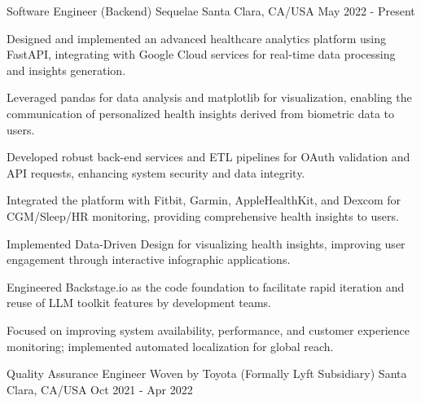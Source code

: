 

\begin{cventries}


  \cventry
    {Software Engineer (Backend)} %
    {Sequelae} %
    {Santa Clara, CA/USA} %
    {May 2022 - Present} %
    {
      \begin{cvitems} %
        \item {Designed and implemented an advanced healthcare analytics platform using FastAPI, integrating with Google Cloud services for real-time data processing and insights generation.}
        \item {Leveraged pandas for data analysis and matplotlib for visualization, enabling the communication of personalized health insights derived from biometric data to users.}
        \item {Developed robust back-end services and ETL pipelines for OAuth validation and API requests, enhancing system security and data integrity.}
        \item {Integrated the platform with Fitbit, Garmin, AppleHealthKit, and Dexcom for CGM/Sleep/HR monitoring, providing comprehensive health insights to users.}
        \item {Implemented Data-Driven Design for visualizing health insights, improving user engagement through interactive infographic applications.}
        \item {Engineered Backstage.io as the code foundation to facilitate rapid iteration and reuse of LLM toolkit features by development teams.}
        \item {Focused on improving system availability, performance, and customer experience monitoring; implemented automated localization for global reach.}
      \end{cvitems}
    }
  \cventry
      {Quality Assurance Engineer} %
      {Woven by Toyota (Formally Lyft Subsidiary)} %
      {Santa Clara, CA/USA} %
      {Oct 2021 - Apr 2022} %

\end{cventries}
